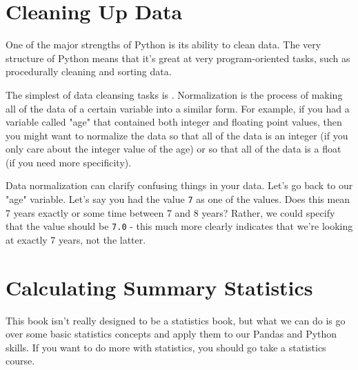 \section{Cleaning Up Data}
One of the major strengths of Python is its ability to clean data. The very structure of Python means that it's great at very program-oriented tasks, such as procedurally cleaning and sorting data.\par
The simplest of data cleansing tasks is . Normalization is the process of making all of the data of a certain variable into a similar form. For example, if you had a variable called "age" that contained both integer and floating point values, then you might want to normalize the data so that all of the data is an integer (if you only care about the integer value of the age) or so that all of the data is a float (if you need more specificity).\par
Data normalization can clarify confusing things in your data. Let's go back to our "age" variable. Let's say you had the value \verb|7| as one of the values. Does this mean 7 years exactly or some time between 7 and 8 years? Rather, we could specify that the value should be \verb|7.0| - this much more clearly indicates that we're looking at exactly 7 years, not the latter.\par
\section{Calculating Summary Statistics}
This book isn't really designed to be a statistics book, but what we can do is go over some basic statistics concepts and apply them to our Pandas and Python skills. If you want to do more with statistics, you should go take a statistics course.\par
{}

